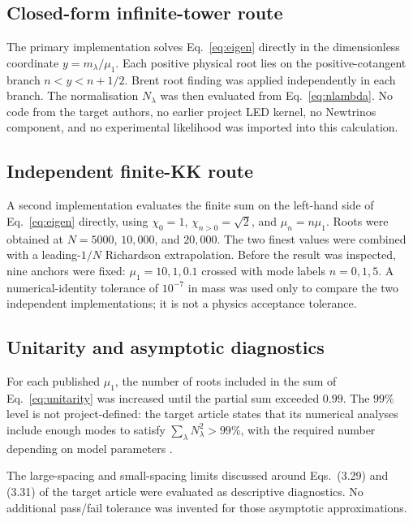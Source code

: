 \subsection{Closed-form infinite-tower route}\label{sec:route-a}

The primary implementation solves Eq.~\eqref{eq:eigen} directly in the dimensionless coordinate $y=m_\lambda/\mu_1$. Each positive physical root lies on the positive-cotangent branch $n<y<n+1/2$. Brent root finding was applied independently in each branch. The normalisation $N_\lambda$ was then evaluated from Eq.~\eqref{eq:nlambda}. No code from the target authors, no earlier project LED kernel, no Newtrinos component, and no experimental likelihood was imported into this calculation.

\subsection{Independent finite-KK route}\label{sec:route-b}

A second implementation evaluates the finite sum on the left-hand side of Eq.~\eqref{eq:eigen} directly, using $\chi_0=1$, $\chi_{n>0}=\sqrt{2}$, and $\mu_n=n\mu_1$. Roots were obtained at $N=5000$, $10{,}000$, and $20{,}000$. The two finest values were combined with a leading-$1/N$ Richardson extrapolation. Before the result was inspected, nine anchors were fixed: $\mu_1=10,1,0.1$ crossed with mode labels $n=0,1,5$. A numerical-identity tolerance of $10^{-7}$ in mass was used only to compare the two independent implementations; it is not a physics acceptance tolerance.

\subsection{Unitarity and asymptotic diagnostics}\label{sec:unitarity-method}

For each published $\mu_1$, the number of roots included in the sum of Eq.~\eqref{eq:unitarity} was increased until the partial sum exceeded $0.99$. The $99\%$ level is not project-defined: the target article states that its numerical analyses include enough modes to satisfy $\sum_\lambda N_\lambda^2>99\%$, with the required number depending on model parameters \autocite{degiorgi2026}.

The large-spacing and small-spacing limits discussed around Eqs.~(3.29) and (3.31) of the target article were evaluated as descriptive diagnostics. No additional pass/fail tolerance was invented for those asymptotic approximations.

